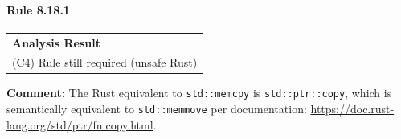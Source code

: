 \paragraph{Rule 8.18.1}
\begin{longtable}{p{13cm}}
\textbf{Analysis Result} \\
(C4) Rule still required (unsafe Rust) \\
\end{longtable}
\textbf{Comment:} The Rust equivalent to \texttt{std::memcpy} is \texttt{std::ptr::copy}, which is semantically equivalent to \texttt{std::memmove} per documentation: \url{https://doc.rust-lang.org/std/ptr/fn.copy.html}. \\


